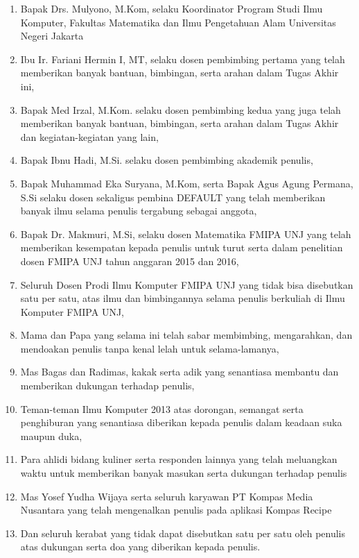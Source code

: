\documentclass{jtetiskripsi}
\begin{document}
\begin{enumerate}
\item{Bapak Drs. Mulyono, M.Kom, selaku Koordinator Program Studi Ilmu Komputer, Fakultas Matematika dan Ilmu Pengetahuan Alam Universitas Negeri Jakarta}
\item{Ibu Ir. Fariani Hermin I, MT, selaku dosen pembimbing pertama yang telah memberikan banyak bantuan, bimbingan, serta arahan dalam Tugas Akhir ini,}
\item{Bapak Med Irzal, M.Kom. selaku dosen pembimbing kedua yang juga telah memberikan banyak bantuan, bimbingan, serta arahan dalam Tugas Akhir dan kegiatan-kegiatan yang lain,}
\item{Bapak Ibnu Hadi, M.Si. selaku dosen pembimbing akademik penulis,}
\item{Bapak Muhammad Eka Suryana, M.Kom, serta Bapak Agus Agung Permana, S.Si selaku dosen sekaligus pembina DEFAULT yang telah memberikan banyak ilmu selama penulis tergabung sebagai anggota,}
\item{Bapak Dr. Makmuri, M.Si, selaku dosen Matematika FMIPA UNJ yang telah memberikan kesempatan kepada penulis untuk turut serta dalam penelitian dosen FMIPA UNJ tahun anggaran 2015 dan 2016,}
\item{Seluruh Dosen Prodi Ilmu Komputer FMIPA UNJ yang tidak bisa disebutkan satu per satu, atas ilmu dan bimbingannya selama penulis berkuliah di Ilmu Komputer FMIPA UNJ,}
\item{Mama dan Papa yang selama ini telah sabar membimbing, mengarahkan, dan mendoakan penulis tanpa kenal lelah untuk selama-lamanya,}
\item{Mas Bagas dan Radimas, kakak serta adik yang senantiasa membantu dan memberikan dukungan terhadap penulis,}
\item{Teman-teman Ilmu Komputer 2013 atas dorongan, semangat serta penghiburan yang senantiasa diberikan kepada penulis dalam keadaan suka maupun duka,}
\item{Para ahlidi bidang kuliner serta responden lainnya yang telah meluangkan waktu untuk memberikan banyak masukan serta dukungan terhadap penulis}
\item{Mas Yosef Yudha Wijaya serta seluruh karyawan PT Kompas Media Nusantara yang telah mengenalkan penulis pada aplikasi Kompas Recipe}
\item{Dan seluruh kerabat yang tidak dapat disebutkan satu per satu oleh penulis atas dukungan serta doa yang diberikan kepada penulis.}
\end{enumerate}
\end{document}
